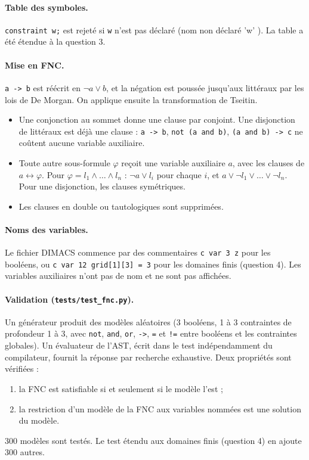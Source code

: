 \documentclass[11pt,a4paper]{article}
\newcommand{\code}[1]{\texttt{#1}}
\begin{document}
\paragraph{Table des symboles.} \code{constraint w;} est rejeté si \code{w} n'est pas déclaré
(\og nom non déclaré 'w' \fg). La table a été étendue à la question 3.

\paragraph{Mise en FNC.} \code{a -> b} est réécrit en $\neg a \vee b$, et la négation est
poussée jusqu'aux littéraux par les lois de De Morgan. On applique ensuite la transformation
de Tseitin.
\begin{itemize}
  \item Une conjonction au sommet donne une clause par conjoint. Une disjonction de littéraux
        est déjà une clause : \code{a -> b}, \code{not (a and b)}, \code{(a and b) -> c} ne
        coûtent aucune variable auxiliaire.
  \item Toute autre sous-formule $\varphi$ reçoit une variable auxiliaire $a$, avec les
        clauses de $a \leftrightarrow \varphi$. Pour $\varphi = l_1 \wedge \dots \wedge l_n$ :
        $\neg a \vee l_i$ pour chaque $i$, et $a \vee \neg l_1 \vee \dots \vee \neg l_n$. Pour
        une disjonction, les clauses symétriques.
  \item Les clauses en double ou tautologiques sont supprimées.
\end{itemize}

\paragraph{Noms des variables.} Le fichier DIMACS commence par des commentaires
\code{c var 3 z} pour les booléens, ou \code{c var 12 grid[1][3] = 3} pour les domaines finis
(question 4). Les variables auxiliaires n'ont pas de nom et ne sont pas affichées.

\paragraph{Validation (\code{tests/test\_fnc.py}).} Un générateur produit des modèles
aléatoires (3 booléens, 1 à 3 contraintes de profondeur 1 à 3, avec \code{not}, \code{and},
\code{or}, \code{->}, \code{=} et \code{!=} entre booléens et les contraintes globales). Un
évaluateur de l'AST, écrit dans le test indépendamment du compilateur, fournit la réponse par
recherche exhaustive. Deux propriétés sont vérifiées :
\begin{enumerate}
  \item la FNC est satisfiable si et seulement si le modèle l'est ;
  \item la restriction d'un modèle de la FNC aux variables nommées est une solution du modèle.
\end{enumerate}
300 modèles sont testés. Le test étendu aux domaines finis (question 4) en ajoute 300 autres.
\end{document}
